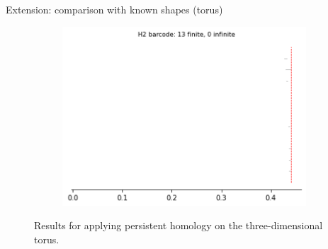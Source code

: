 \documentclass[xcolor={dvipsnames,svgnames}]{beamer}
\begin{document}
\begin{frame}{Extension: comparison with known shapes (torus)}
\begin{figure}[H]
\begin{subfigure}[b]{0.2\textwidth}
\includegraphics[width=\textwidth]{figures/torus_H2_barcode.png}
 \caption{}
\end{subfigure}
\caption{Results for applying persistent homology on the three-dimensional torus.}
\end{figure}
\end{frame}
\end{document}
